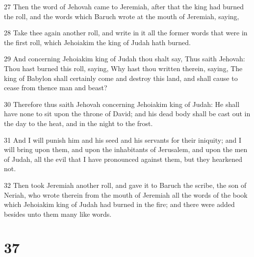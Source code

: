 \par 27 Then the word of Jehovah came to Jeremiah, after that the king had burned the roll, and the words which Baruch wrote at the mouth of Jeremiah, saying,
\par 28 Take thee again another roll, and write in it all the former words that were in the first roll, which Jehoiakim the king of Judah hath burned.
\par 29 And concerning Jehoiakim king of Judah thou shalt say, Thus saith Jehovah: Thou hast burned this roll, saying, Why hast thou written therein, saying, The king of Babylon shall certainly come and destroy this land, and shall cause to cease from thence man and beast?
\par 30 Therefore thus saith Jehovah concerning Jehoiakim king of Judah: He shall have none to sit upon the throne of David; and his dead body shall be cast out in the day to the heat, and in the night to the frost.
\par 31 And I will punish him and his seed and his servants for their iniquity; and I will bring upon them, and upon the inhabitants of Jerusalem, and upon the men of Judah, all the evil that I have pronounced against them, but they hearkened not.
\par 32 Then took Jeremiah another roll, and gave it to Baruch the scribe, the son of Neriah, who wrote therein from the mouth of Jeremiah all the words of the book which Jehoiakim king of Judah had burned in the fire; and there were added besides unto them many like words.

\chapter{37}

